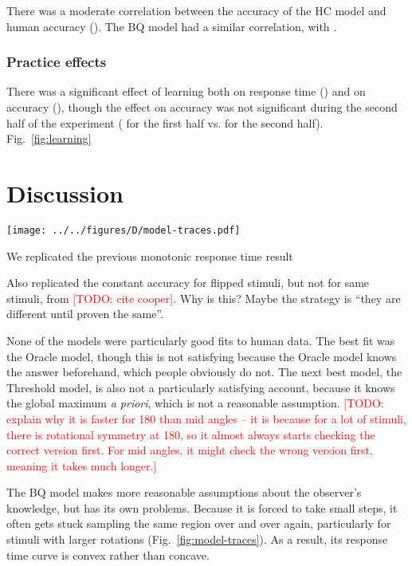 \documentclass[10pt,letterpaper]{article}
\newcommand{\TODO}[1]{\textcolor{red}{[TODO: #1]}}
\newcommand{\Oc}[0]{Oracle}
\newcommand{\Th}[0]{Threshold}
\newcommand{\Hc}[0]{HC}
\newcommand{\Bq}[0]{BQ}
\begin{document}
There was a moderate correlation between the accuracy of the \Hc{}
model and human accuracy (\ExpHcAccuracyCorr{}). The \Bq{} model had a
similar correlation, with \ExpBqAccuracyCorr{}.

\subsubsection{Practice effects} 

There was a significant effect of learning both on response time
(\ExpTrialTimeCorr{}) and on accuracy (\ExpTrialAccuracyCorr{}),
though the effect on accuracy was not significant during the second
half of the experiment (\ExpaTrialAccuracyCorr{} for the first half
vs. \ExpbTrialAccuracyCorr{} for the second
half). Fig.~\ref{fig:learning}


\section{Discussion}

\begin{figure*}[t]
  \begin{center}
    \texttt{[image: ../../figures/D/model-traces.pdf]}
    \caption{\textbf{Model traces.} \TODO{} \TODO{put pictures of the
        stimuli here}}
    \label{fig:model-traces}
  \end{center}
\end{figure*}

We replicated the previous monotonic response time result

Also replicated the constant accuracy for flipped stimuli, but not for
same stimuli, from \TODO{cite cooper}. Why is this? Maybe the strategy
is ``they are different until proven the same''.

None of the models were particularly good fits to human data. The best
fit was the \Oc{} model, though this is not satisfying because the
\Oc{} model knows the answer beforehand, which people obviously do
not. The next best model, the \Th{} model, is also not a
particularly satisfying account, because it knows the global maximum
\textit{a priori}, which is not a reasonable assumption. \TODO{explain
  why it is faster for 180 than mid angles -- it is because for a lot
  of stimuli, there is rotational symmetry at 180, so it almost always
  starts checking the correct version first. For mid angles, it might
  check the wrong version first, meaning it takes much longer.}

The \Bq{} model makes more reasonable assumptions about the observer's
knowledge, but has its own problems. Because it is forced to take
small steps, it often gets stuck sampling the same region over and
over again, particularly for stimuli with larger rotations
(Fig.~\ref{fig:model-traces}). As a result, its response time curve is
convex rather than concave.
\end{document}
